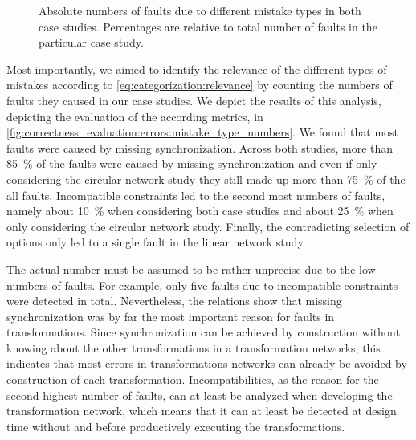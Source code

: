

\begin{figure}
    
    \caption[Number of occurrences of mistake types]{Absolute numbers of faults due to different mistake types in both case studies. Percentages are relative to total number of faults in the particular case study.}
    \label{fig:correctness_evaluation:errors:mistake_type_numbers}
\end{figure}

Most importantly, we aimed to identify the relevance of the different types of mistakes according to \autoref{eq:categorization:relevance} by counting the numbers of faults they caused in our case studies.
We depict the results of this analysis, depicting the evaluation of the according metrics, in \autoref{fig:correctness_evaluation:errors:mistake_type_numbers}.
We found that most faults were caused by missing synchronization.
Across both studies, more than \SI{85}{\percent} of the faults were caused by missing synchronization and even if only considering the circular network study they still made up more than \SI{75}{\percent} of the all faults.
Incompatible constraints led to the second most numbers of faults, namely about \SI{10}{\percent} when considering both case studies and about \SI{25}{\percent} when only considering the circular network study.
Finally, the contradicting selection of options only led to a single fault in the linear network study.

The actual number must be assumed to be rather unprecise due to the low numbers of faults.
For example, only five faults due to incompatible constraints were detected in total.
Nevertheless, the relations show that missing synchronization was by far the most important reason for faults in transformations.
Since synchronization can be achieved by construction without knowing about the other transformations in a transformation networks, this indicates that most errors in transformations networks can already be avoided by construction of each transformation.
Incompatibilities, as the reason for the second highest number of faults, can at least be analyzed when developing the transformation network, which means that it can at least be detected at design time without and before productively executing the transformations.

